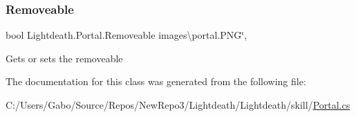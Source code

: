 \subsubsection{\texorpdfstring{Removeable}{Removeable}}
{\footnotesize\ttfamily bool Lightdeath.\+Portal.\+Removeable images\textbackslash{}portal.\+P\+NG\char`\"{}\hspace{0.3cm}{\ttfamily [get]}, {\ttfamily [set]}}



Gets or sets the removeable 



The documentation for this class was generated from the following file\+:\begin{DoxyCompactItemize}
\item 
C\+:/\+Users/\+Gabo/\+Source/\+Repos/\+New\+Repo3/\+Lightdeath/\+Lightdeath/skill/\hyperlink{_portal_8cs}{Portal.\+cs}\end{DoxyCompactItemize}
